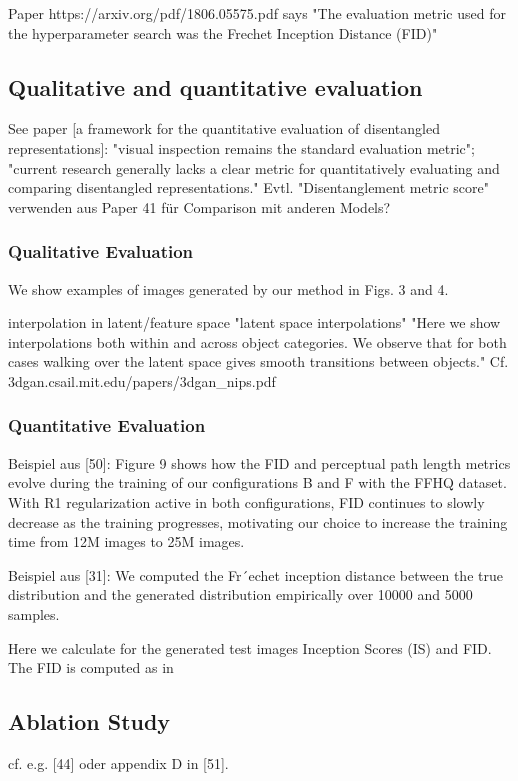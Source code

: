 \documentclass[11pt,a4paper]{article}
\begin{document}
\par Paper https://arxiv.org/pdf/1806.05575.pdf says "The evaluation metric used for the hyperparameter search was the Frechet Inception Distance (FID)"

\subsection{Qualitative and quantitative evaluation}
See paper [a framework for the quantitative evaluation of disentangled representations]: "visual inspection remains the standard evaluation metric"; "current research generally lacks a clear metric for quantitatively evaluating and comparing disentangled representations."
Evtl. "Disentanglement metric score" verwenden aus Paper 41 für Comparison mit anderen Models?

\subsubsection{Qualitative Evaluation}
We show examples of images generated by our method in Figs. 3 and 4.

interpolation in latent/feature space
"latent space interpolations"
"Here we show interpolations both within and across object categories. We observe that for both cases walking over the latent space gives smooth transitions between objects." Cf. 3dgan.csail.mit.edu/papers/3dgan\_nips.pdf

\subsubsection{Quantitative Evaluation}
Beispiel aus [50]: Figure 9 shows how the FID and perceptual path length metrics evolve during the training of our configurations B and F with the FFHQ dataset. With R1 regularization active in both configurations, FID continues to slowly decrease as the training progresses, motivating our choice to increase the training time from 12M images to 25M images.

Beispiel aus [31]: We computed the Fr´echet inception distance between the true distribution and the generated
distribution empirically over 10000 and 5000 samples.

Here we calculate for the generated test images Inception Scores (IS) and FID. The FID is computed as in 


\subsection{Ablation Study}
cf. e.g. [44] oder appendix D in [51].
\end{document}
